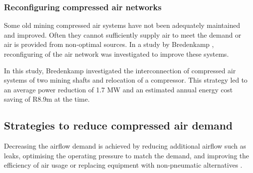 		\subsubsection{Reconfiguring compressed air networks}
			Some old mining compressed air systems have not been adequately maintained and improved. Often they cannot sufficiently supply air to meet the demand or air is provided from non-optimal sources. In a study by Bredenkamp \cite{Bredenkamp2013Masters}, reconfiguring of the air network was investigated to improve these systems.
			\par 
			In this study, Bredenkamp investigated the interconnection of compressed air systems of two mining shafts and relocation of a compressor. This strategy led to an average power reduction of 1.7 MW and an estimated annual energy cost saving of R8.9m at the time.
			
	\subsection{Strategies to reduce compressed air demand}
	Decreasing the airflow demand is achieved by reducing additional airflow such as leaks, optimising the operating pressure to match the demand\footnotemark[2], and improving the efficiency of air usage or replacing equipment with non-pneumatic alternatives \cite{Snyman2011Masters}.
